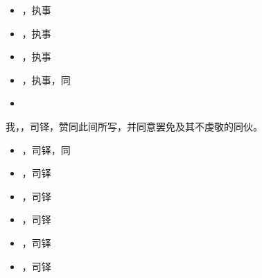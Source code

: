 \begin{itemize}
\item {}，执事
\end{itemize}

\begin{itemize}
\item {}，执事
\end{itemize}

\begin{itemize}
\item {}，执事
\end{itemize}

\begin{itemize}
\item {}，执事，同
\end{itemize}

\begin{itemize}
\item {}
\end{itemize}

我，，司铎，赞同此间所写，并同意罢免及其不虔敬的同伙。\par

\begin{itemize}
\item {}，司铎，同
\end{itemize}

\begin{itemize}
\item {}，司铎
\end{itemize}

\begin{itemize}
\item {}，司铎
\end{itemize}

\begin{itemize}
\item {}，司铎
\end{itemize}

\begin{itemize}
\item {}，司铎
\end{itemize}

\begin{itemize}
\item {}，司铎
\end{itemize}

